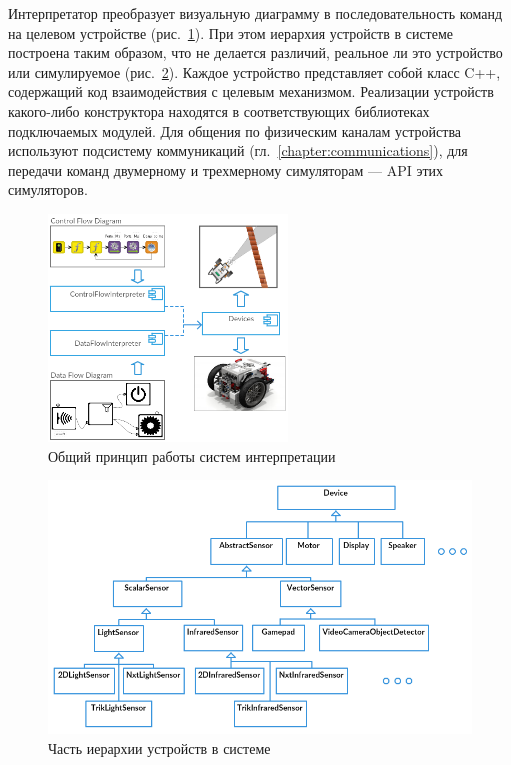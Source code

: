 \documentclass[a5paper]{article}
\begin{document}
Интерпретатор преобразует визуальную диаграмму в последовательность команд на целевом устройстве (рис.~\ref{image:interpretersTSArch}). При этом иерархия устройств в системе построена таким образом, что не делается различий, реальное ли это устройство или симулируемое (рис.~\ref{image:devicesTSArch}). Каждое устройство представляет собой класс C++, содержащий код взаимодействия с целевым механизмом. Реализации устройств какого-либо конструктора находятся в соответствующих библиотеках подключаемых модулей. Для общения по физическим каналам устройства используют подсистему коммуникаций (гл.~\ref{chapter:communications}), для передачи команд двумерному и трехмерному симуляторам --- API этих симуляторов.

\begin{figure}[ht]
    \centering
    \includegraphics[width=2.5in]{TS_Interpreter_Architecture.png}
    \caption{Общий принцип работы систем интерпретации}
    \label{image:interpretersTSArch}
\end{figure}

\begin{figure}[ht]
    \centering
    \includegraphics[width=4.5in]{TS_Devices_Architecture.png}
    \caption{Часть иерархии устройств в системе}
    \label{image:devicesTSArch}
\end{figure}
\end{document}
